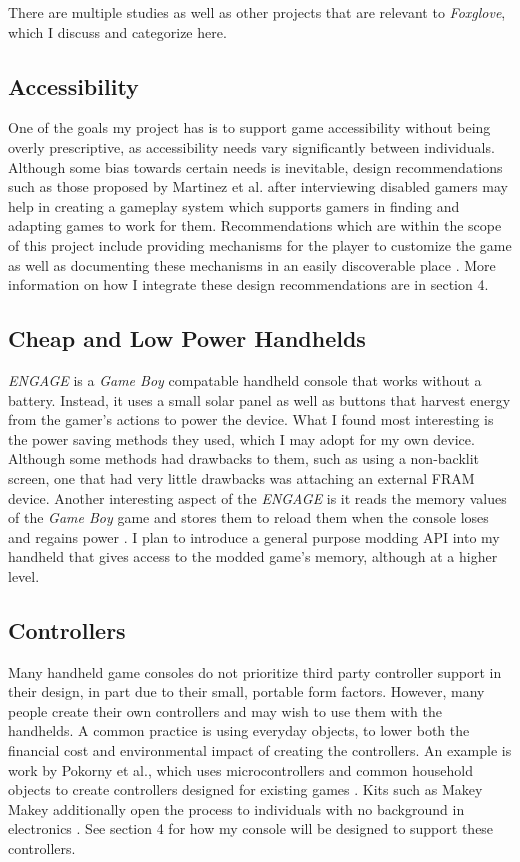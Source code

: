 \documentclass[10pt,twocolumn]{article}
\begin{document}
There are multiple studies as well as other projects that are relevant to
\textit{Foxglove}, which I discuss and categorize here.

\subsection{Accessibility}

One of the goals my project has is to support game accessibility without being
overly prescriptive, as accessibility needs vary significantly between
individuals. Although some bias towards certain needs is inevitable, design
recommendations such as those proposed by Martinez et al. after interviewing
disabled gamers may help in creating a gameplay system which supports gamers in
finding and adapting games to work for them. Recommendations which are within
the scope of this project include providing mechanisms for the player to
customize the game as well as documenting these mechanisms in an easily
discoverable place \cite{martinez_playing_2024}. More information on how I
integrate these design recommendations are in section 4.

\subsection{Cheap and Low Power Handhelds}

\textit{ENGAGE} is a \textit{Game Boy} compatable handheld console that works
without a battery.
Instead, it uses a small solar panel as well as buttons that harvest energy
from the gamer's actions to power the device.
What I found most interesting is the power saving methods they used,
which I may adopt for my own device.
Although some methods had drawbacks to them, such as using a non-backlit screen,
one that had very little drawbacks was attaching an external FRAM device.
Another interesting aspect of the \textit{ENGAGE} is it
reads the memory values of the \textit{Game Boy} game
and stores them to reload them
when the console loses and regains power \cite{de_winkel_battery-free_2020}.
I plan to introduce a general purpose modding API into my handheld that
gives access to the modded game's memory, although at a higher level.

\subsection{Controllers}

Many handheld game consoles do not prioritize third party controller support
in their design, in part due to their small, portable form factors.
However, many people create their own controllers and may wish
to use them with the handhelds. A common practice is using everyday objects, to
lower both the financial cost and environmental impact of
creating the controllers. An example is work by Pokorny et al., which uses
microcontrollers and common household objects to create controllers designed for
existing games \cite{pokorny_bin_2023}. Kits such as Makey Makey additionally
open the process to individuals with no background in electronics
\cite{collective_makey_2012}. See section 4 for how my console will be designed
to support these controllers.
\end{document}

